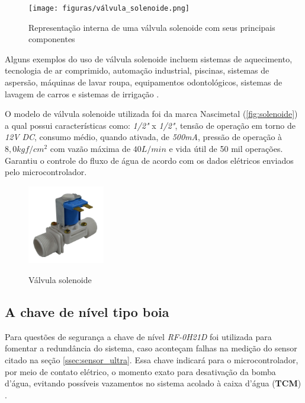 \begin{figure}[H]
	\centering
	\caption{Representação interna de uma válvula solenoide com seus principais componentes}
	\texttt{[image: figuras/válvula\_solenoide.png]}
	\label{fig:valvula_solenoide}
\end{figure}

Alguns exemplos do uso de válvula solenoide incluem sistemas de aquecimento, tecnologia de ar comprimido, automação industrial, piscinas, sistemas de aspersão, máquinas de lavar roupa, equipamentos odontológicos, sistemas de lavagem de carros e sistemas de irrigação \cite{Citisystems}.

O modelo de válvula solenoide utilizada foi da marca Nascimetal (\autoref{fig:solenoide}) a qual possui características como:  \textit{1/2"} x \textit{1/2"}, tensão de operação em torno de \textit{12V} \textit{DC}, consumo médio, quando ativada, de \textit{500mA}, pressão de operação à $8,0 kgf/cm^2$ com vazão máxima de $40L/min$ e vida útil de 50 mil operações. Garantiu o controle do fluxo de água de acordo com os dados elétricos enviados pelo microcontrolador.

\begin{figure}[H]
	\centering
	\caption{Válvula solenoide}
	\includegraphics[width=0.3\textwidth]{figuras/solenoide.jpg}
	\label{fig:solenoide}
\end{figure}

\subsection{A chave de nível tipo boia}

Para questões de segurança a chave de nível \textit{RF-0H21D} foi utilizada para fomentar a redundância do sistema, caso aconteçam falhas na medição do sensor citado na seção \ref{ssec:sensor_ultra}. Essa chave indicará para o microcontrolador, por meio de contato elétrico, o momento exato para desativação da bomba d'água, evitando possíveis vazamentos no sistema acolado à caixa d'água (\textbf{TCM}) . 

